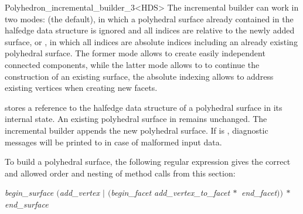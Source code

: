 \begin{ccRefClass}{Polyhedron_incremental_builder_3<HDS>}
The incremental builder can work in two modes:  (the
default), in which a polyhedral surface already contained in the
halfedge data structure is ignored and all indices are relative to the
newly added surface, or , in which all indices are
absolute indices including an already existing polyhedral surface. The
former mode allows to create easily independent connected components,
while the latter mode allows to to continue the construction of an
existing surface, the absolute indexing allows to address existing
vertices when creating new facets.


\ccTypes


\ccGlue
{}
\ccGlue
{}

\ccGlue
{}
\ccGlue
{}

\ccConstants



\ccCreation
{}
\ccThreeToTwo

 {stores a reference to the halfedge data structure  of a
   polyhedral surface in its internal state. An existing polyhedral
   surface in  remains unchanged. The incremental builder
   appends the new polyhedral surface. If  is ,
   diagnostic messages will be printed to  in case of
   malformed input data.}


To build a polyhedral surface, the following regular expression gives
the correct and allowed order and nesting of method calls from this
section:

{\it
    \hspace*{6mm} begin\_surface $($add\_vertex $|$ 
                  $($begin\_facet add\_vertex\_to\_facet$\:*$
                            end\_facet\/$))\:*$ end\_surface
}



\end{ccRefClass}
